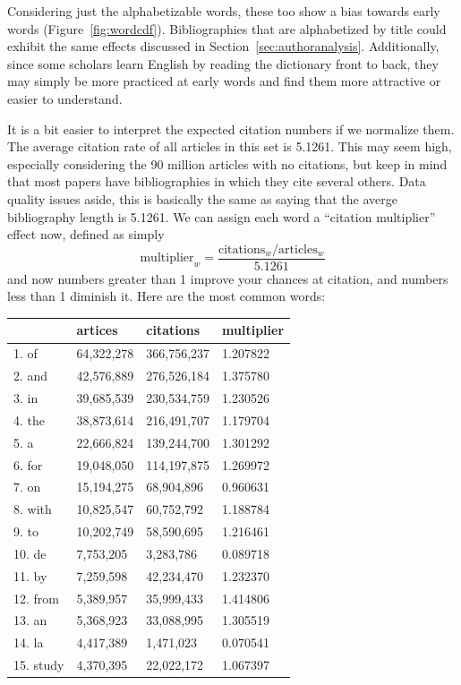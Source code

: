 \documentclass[twocolumn]{article}
\begin{document}
Considering just the alphabetizable words, these too show a bias
towards early words (Figure~\ref{fig:wordcdf}). Bibliographies that
are alphabetized by title could exhibit the same effects discussed in
Section~\ref{sec:authoranalysis}. Additionally, since some scholars
learn English by reading the dictionary front to back, they may
simply be more practiced at early words and find them more attractive
or easier to understand.

\medskip
It is a bit easier to interpret the expected citation numbers if we
normalize them. The average citation rate of all articles in this set
is 5.1261. This may seem high, especially considering the 90 million
articles with no citations, but keep in mind that most papers have
bibliographies in which they cite several others. Data quality issues
aside, this is basically the same as saying that the averge
bibliography length is 5.1261. We can assign each word a ``citation
multiplier'' effect now, defined as simply
$$
\mathrm{multiplier}_w = \frac{\mathrm{citations}_w / \mathrm{articles}_w}{5.1261}
$$
and now numbers greater than 1 improve your chances at citation, and
numbers less than 1 diminish it. Here are the most common words:

\begin{tabular}{l|l|l|l}
\,  & artices & citations & multiplier \\
  \hline
1. of & 64,322,278 & 366,756,237 & 1.207822 \\
2. and & 42,576,889 & 276,526,184 & 1.375780 \\
3. in & 39,685,539 & 230,534,759 & 1.230526 \\
4. the & 38,873,614 & 216,491,707 & 1.179704 \\
5. a   & 22,666,824 & 139,244,700 & 1.301292 \\
6. for & 19,048,050 & 114,197,875 & 1.269972 \\
7. on & 15,194,275 & 68,904,896 & 0.960631 \\
8. with & 10,825,547 & 60,752,792 & 1.188784 \\
9. to & 10,202,749 & 58,590,695 & 1.216461 \\
10. de & 7,753,205 & 3,283,786 & 0.089718 \\
11. by & 7,259,598 & 42,234,470 & 1.232370 \\
12. from & 5,389,957 & 35,999,433 & 1.414806 \\
13. an & 5,368,923 & 33,088,995 & 1.305519 \\
14. la & 4,417,389 & 1,471,023 & 0.070541 \\
15. study & 4,370,395 & 22,022,172 & 1.067397 \\
\end{tabular}
\end{document}
